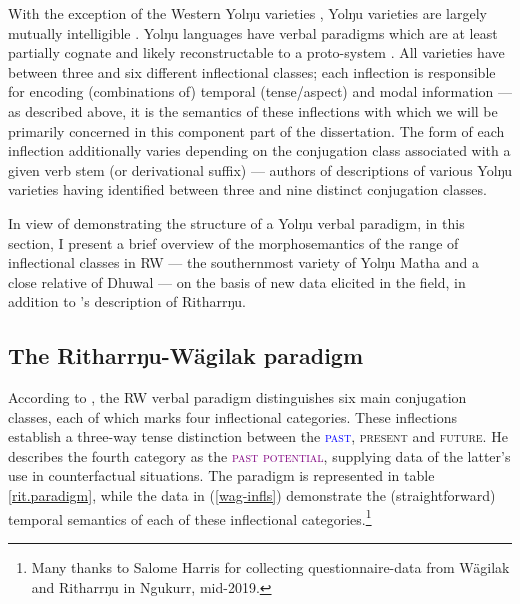With the exception of the Western Yolŋu varieties \citetext{\textit{i.e.}, Djinaŋ \& Djinba, see \citealp{Schebeck2001,Waters1989}}, Yolŋu varieties are largely mutually intelligible \citep{Heath1981b,Morphy1983}. Yolŋu languages have verbal paradigms which are at least partially cognate and likely reconstructable to a proto-system \citetext{\citealp{Schebeck2001}, \citealp[see comparative reconstruction pilot work by][]{Bowern2009}}. All varieties have between three and six different inflectional classes; each inflection is responsible for encoding (combinations of) temporal (tense/aspect) and modal information --- as described above, it is the semantics of these inflections with which we will be primarily concerned in this component part of the dissertation. The form of each inflection additionally varies depending on the conjugation class associated with a given verb stem (or derivational suffix) --- authors of descriptions of various Yolŋu varieties having identified between three \citetext{\citealp[\textit{e.g.},][]{Waters1989} on Djinba \& Djinba} and nine \citetext{\citealp[\textit{e.g.},][]{Lowe1996} on Gupapuyŋu} distinct conjugation classes.

In view of demonstrating the structure of a Yolŋu verbal paradigm, in this section, I present a brief overview of the morphosemantics of the range of inflectional classes in \acrfull{RW} --- the southernmost variety of Yolŋu Matha and a close relative of Dhuwal --- on the basis of new data elicited in the field, in addition to \citeauthor{Heath1980r}'s \citeyearpar{Heath1980r} description of Ritharrŋu.

\subsection{The Ritharrŋu-Wägilak paradigm}\label{sec:rit.paradigm}

According to \citet[60--75]{Heath1980r}, the \acrfull{RW} verbal paradigm distinguishes six main conjugation classes, each of which marks four inflectional categories. These inflections establish a three-way tense distinction between the \textcolor{blue}{\textsc{past}}, \textcolor{forest}{\textsc{present}} and \textcolor{ochre}{\textsc{future}}. He describes the fourth category as the \textcolor{purple}{\textsc{past potential}}, supplying data of the latter's use in counterfactual situations. The paradigm is represented in table \ref{rit.paradigm}, while the data in (\ref{wag-infls}) demonstrate the (straightforward) temporal semantics of each of these inflectional categories.\footnote{Many thanks to Salome Harris for collecting questionnaire-data from Wägilak and Ritharrŋu in Ngukurr, mid-2019.}


